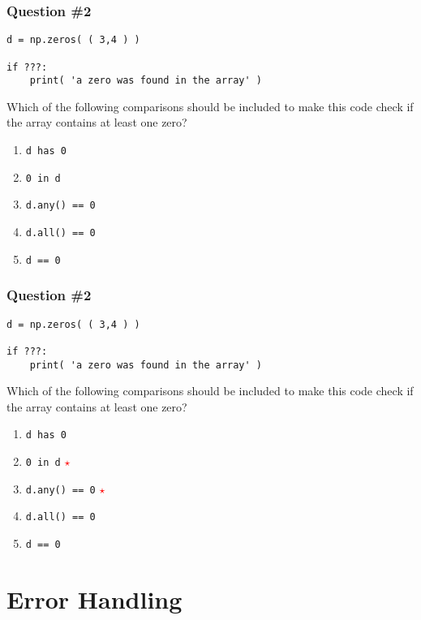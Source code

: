 \documentclass[11pt]{beamer}
\newcommand{\correctstar}{{\Large\textcolor{red}{$\star$}}}
\begin{document}
\begin{frame}[fragile]
  \frametitle{Question \#2}
  \Enlarge

  \begin{Verbatim}
d = np.zeros( ( 3,4 ) )

if ???:
    print( 'a zero was found in the array' )
  \end{Verbatim}

  Which of the following comparisons should be included to make this code check if the array contains at least one zero?

  \begin{enumerate}[label=\Alph*]
    \item  \texttt{d has 0}
    \item  \texttt{0 in d}
    \item  \texttt{d.any() == 0}
    \item  \texttt{d.all() == 0}
    \item  \texttt{d == 0}
  \end{enumerate}
\end{frame}

\begin{frame}[fragile]
  \frametitle{Question \#2}
  \Enlarge

  \begin{Verbatim}
d = np.zeros( ( 3,4 ) )

if ???:
    print( 'a zero was found in the array' )
  \end{Verbatim}

  Which of the following comparisons should be included to make this code check if the array contains at least one zero?

  \begin{enumerate}[label=\Alph*]
    \item  \texttt{d has 0}
    \item  \texttt{0 in d}  \correctstar
    \item  \texttt{d.any() == 0}  \correctstar
    \item  \texttt{d.all() == 0}
    \item  \texttt{d == 0}
  \end{enumerate}
\end{frame}

\section{Error Handling}
\end{document}
